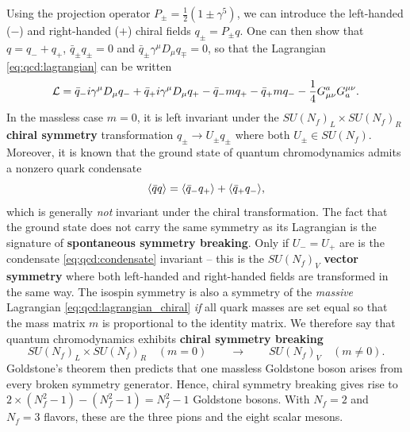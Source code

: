 Using the projection operator $P_\pm = \frac12 (1 \pm \gamma^5)$, we can introduce the left-handed ($-$) and right-handed ($+$) chiral fields $q_\pm = P_\pm q$.
One can then show that $q = q_- + q_+$, $\bar{q}_\pm q_\pm = 0$ and $\bar{q}_\pm \gamma^\mu D_\mu q_\mp = 0$, so that the Lagrangian \eqref{eq:qcd:lagrangian} can be written
\begin{equation}
	\mathcal{L} = \bar{q}_- i \gamma^\mu D_\mu q_- + \bar{q}_+ i \gamma^\mu D_\mu q_+ - \bar{q}_- m q_+ - \bar{q}_+ m q_- - \frac14 G_{\mu\nu}^a G^{\mu\nu}_a.
\label{eq:qcd:lagrangian_chiral}
\end{equation}
In the massless case $m=0$,
it is left invariant under the $SU(N_f)_L \times SU(N_f)_R$ \textbf{chiral symmetry} transformation $q_\pm \rightarrow U_\pm q_\pm$ where both $U_\pm \in SU(N_f)$.
Moreover, it is known that the ground state of quantum chromodynamics admits a nonzero quark condensate \cite[chapter 28]{ref:schwartz}
\begin{equation}
	\avg{\bar{q} q} %
	                                                            = \avg{\bar{q}_- q_+} + \avg{\bar{q}_+ q_-},
\label{eq:qcd:condensate}
\end{equation}
which is generally \emph{not} invariant under the chiral transformation.
The fact that the ground state does not carry the same symmetry as its Lagrangian is the signature of \textbf{spontaneous symmetry breaking}.
Only if $U_- = U_+$ are is the condensate \eqref{eq:qcd:condensate} invariant -- this is the $SU(N_f)_V$ \textbf{vector symmetry} where both left-handed and right-handed fields are transformed in the same way.
The isospin symmetry is also a symmetry of the \emph{massive} Lagrangian \eqref{eq:qcd:lagrangian_chiral} \emph{if} all quark masses are set equal so that the mass matrix $m$ is proportional to the identity matrix.
We therefore say that quantum chromodynamics exhibits \textbf{chiral symmetry breaking}
\begin{equation}
	SU(N_f)_L \times SU(N_f)_R \quad (m = 0) \qquad \longrightarrow \qquad SU(N_f)_V \quad (m \neq 0).
\label{eq:qcd:symmetry_breaking_pattern}
\end{equation}
Goldstone's theorem then predicts that one massless Goldstone boson arises from every broken symmetry generator.
Hence, chiral symmetry breaking gives rise to $2 \times (N_f^2 - 1) - (N_f^2 - 1) = N_f^2 - 1$ Goldstone bosons.
With $N_f = 2$ and $N_f = 3$ flavors, these are the three pions and the eight scalar mesons.

